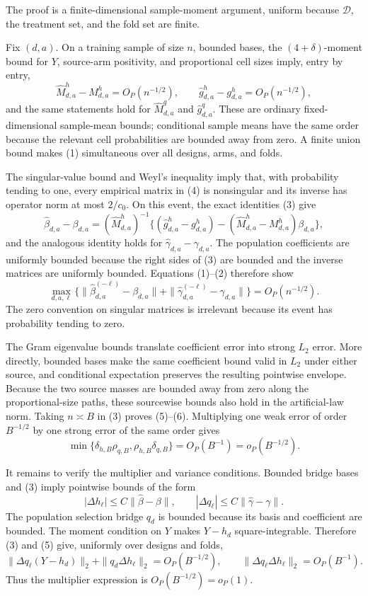 The proof is a finite-dimensional sample-moment argument, uniform because \(\mathcal D\), the treatment set, and the fold set are finite.

Fix \((d,a)\).  On a training sample of size \(n\), bounded bases, the \((4+\delta)\)-moment bound for \(Y\), source-arm positivity, and proportional cell sizes imply, entry by entry,
\[
 \widehat M^h_{d,a}-M^h_{d,a}=O_P(n^{-1/2}),
 \qquad
 \widehat g^h_{d,a}-g^h_{d,a}=O_P(n^{-1/2}),                  \tag{1}
\]
and the same statements hold for \(\widehat M^q_{d,a}\) and \(\widehat g^q_{d,a}\).  These are ordinary fixed-dimensional sample-mean bounds; conditional sample means have the same order because the relevant cell probabilities are bounded away from zero.  A finite union bound makes (1) simultaneous over all designs, arms, and folds.

The singular-value bound and Weyl's inequality imply that, with probability tending to one, every empirical matrix in (4) is nonsingular and its inverse has operator norm at most \(2/c_0\).  On this event, the exact identities (3) give
\[
 \widehat\beta_{d,a}-\beta_{d,a}
 =(\widehat M^h_{d,a})^{-1}
 \{(\widehat g^h_{d,a}-g^h_{d,a})
 -(\widehat M^h_{d,a}-M^h_{d,a})\beta_{d,a}\},               \tag{2}
\]
and the analogous identity holds for \(\widehat\gamma_{d,a}-\gamma_{d,a}\).  The population coefficients are uniformly bounded because the right sides of (3) are bounded and the inverse matrices are uniformly bounded.  Equations (1)--(2) therefore show
\[
 \max_{d,a,\ell}
 \{\|\widehat\beta_{d,a}^{(-\ell)}-\beta_{d,a}\|
 +\|\widehat\gamma_{d,a}^{(-\ell)}-\gamma_{d,a}\|\}
 =O_P(n^{-1/2}).                                               \tag{3}
\]
The zero convention on singular matrices is irrelevant because its event has probability tending to zero.

The Gram eigenvalue bounds translate coefficient error into strong \(L_2\) error.  More directly, bounded bases make the same coefficient bound valid in \(L_2\) under either source, and conditional expectation preserves the resulting pointwise envelope.  Because the two source masses are bounded away from zero along the proportional-size paths, these sourcewise bounds also hold in the artificial-law norm.  Taking \(n\asymp B\) in (3) proves (5)--(6).  Multiplying one weak error of order \(B^{-1/2}\) by one strong error of the same order gives
\[
 \min\{\delta_{h,B}\rho_{q,B},\rho_{h,B}\delta_{q,B}\}
 =O_P(B^{-1})=o_P(B^{-1/2}).                                  \tag{4}
\]

It remains to verify the multiplier and variance conditions.  Bounded bridge bases and (3) imply pointwise bounds of the form
\[
 |\Delta h_\ell|\le C\|\widehat\beta-\beta\|,
 \qquad
 |\Delta q_\ell|\le C\|\widehat\gamma-\gamma\|.           \tag{5}
\]
The population selection bridge \(q_d\) is bounded because its basis and coefficient are bounded.  The moment condition on \(Y\) makes \(Y-h_d\) square-integrable.  Therefore (3) and (5) give, uniformly over designs and folds,
\[
 \|\Delta q_\ell(Y-h_d)\|_2
 +\|q_d\Delta h_\ell\|_2=O_P(B^{-1/2}),
 \qquad
 \|\Delta q_\ell\Delta h_\ell\|_2=O_P(B^{-1}).             \tag{6}
\]
Thus the multiplier expression is \(O_P(B^{-1/2})=o_P(1)\).

